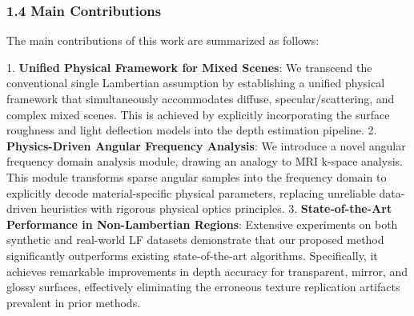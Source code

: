\subsubsection{1.4 Main Contributions}

The main contributions of this work are summarized as follows:

1. \textbf{Unified Physical Framework for Mixed Scenes}: We transcend the conventional single Lambertian assumption by establishing a unified physical framework that simultaneously accommodates diffuse, specular/scattering, and complex mixed scenes. This is achieved by explicitly incorporating the surface roughness and light deflection models into the depth estimation pipeline.
2. \textbf{Physics-Driven Angular Frequency Analysis}: We introduce a novel angular frequency domain analysis module, drawing an analogy to MRI k-space analysis. This module transforms sparse angular samples into the frequency domain to explicitly decode material-specific physical parameters, replacing unreliable data-driven heuristics with rigorous physical optics principles.
3. \textbf{State-of-the-Art Performance in Non-Lambertian Regions}: Extensive experiments on both synthetic and real-world LF datasets demonstrate that our proposed method significantly outperforms existing state-of-the-art algorithms. Specifically, it achieves remarkable improvements in depth accuracy for transparent, mirror, and glossy surfaces, effectively eliminating the erroneous texture replication artifacts prevalent in prior methods.